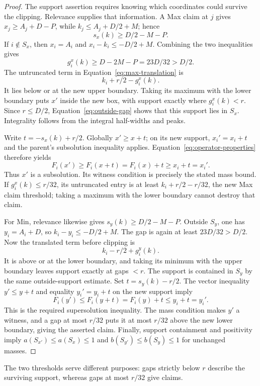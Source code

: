 \begin{proof}
The support assertion requires knowing which coordinates could survive
the clipping. Relevance supplies that information. A Max claim at
$j$ gives $x_j\ge A_j+D-P$, while $k_j\le A_j+D/2+M$;
hence
\begin{equation}
                         s_x(k)\ge D/2-M-P.
 \label{eq:peak-lower}
\end{equation}
If $i\notin S_x$, then $x_i=A_i$ and
$x_i-k_i\le-D/2+M$. Combining the two inequalities gives
\begin{equation}
                  g_i^x(k)\ge D-2M-P=23D/32>D/2.
 \label{eq:outside-gap}
\end{equation}
The untruncated term in Equation~\eqref{eq:max-translation} is
\[
                   k_i+r/2-g_i^x(k).
\]
It lies below or at the new upper boundary. Taking its maximum with
the lower boundary puts $x'$ inside the new box, with
support exactly where $g_i^x(k)<r$. Since $r\le D/2$,
Equation~\eqref{eq:outside-gap} shows that this support lies in
$S_x$. Integrality follows from the integral half-widths and peaks.

Write $t=-s_x(k)+r/2$. Globally $x'\ge x+t$; on its new
support, $x_i'=x_i+t$ and the parent's subsolution inequality
applies. Equation~\eqref{eq:operator-properties} therefore yields
\[
                 F_i(x')\ge F_i(x+t)=F_i(x)+t
                                \ge x_i+t=x_i'.
\]
Thus $x'$ is a subsolution. Its witness condition is precisely the
stated mass bound. If $g_i^x(k)\le r/32$, its untruncated entry
is at least $k_i+r/2-r/32$, the new Max claim threshold; taking a
maximum with the lower boundary cannot destroy that claim.

For Min, relevance likewise gives $s_y(k)\ge D/2-M-P$.
Outside $S_y$, one has $y_i=A_i+D$, so
$k_i-y_i\le-D/2+M$. The gap is again at least $23D/32>D/2$.
Now the translated term before clipping is
\[
                   k_i-r/2+g_i^y(k).
\]
It is above or at the lower boundary, and taking its minimum with
the upper boundary leaves support exactly at gaps $<r$. The support
is contained in $S_y$ by the same outside-support estimate. Set
$t=s_y(k)-r/2$. The vector inequality $y'\le y+t$ and equality
$y_i'=y_i+t$ on the new support imply
\[
                 F_i(y')\le F_i(y+t)=F_i(y)+t
                                \le y_i+t=y_i'.
\]
This is the required supersolution inequality. The mass condition
makes $y'$ a witness, and a gap at most $r/32$ puts it at most
$r/32$ above the new lower boundary, giving the asserted claim.
Finally, support containment and positivity imply
$a(S_{x'})\le a(S_x)\le1$ and
$b(S_{y'})\le b(S_y)\le1$ for unchanged masses.
\end{proof}

The two thresholds serve different purposes: gaps strictly below $r$
describe the surviving support, whereas gaps at most $r/32$ give
claims.
